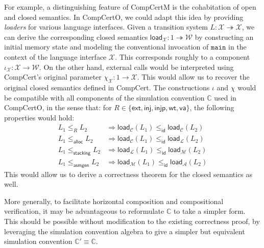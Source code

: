 \documentclass[11pt,oneside]{book}
\theoremstyle{definition}
\newcommand{\kw}[1]{\ensuremath{ \mathsf{#1} }}
\begin{document}
For example,
a distinguishing feature of CompCertM
is the cohabitation of open and closed semantics.
In CompCertO,
we could adapt this idea by providing
\emph{loaders} for various language interfaces.
Given a transition system $L : \mathcal{X} \twoheadrightarrow \mathcal{X}$,
we can derive the corresponding closed semantics
$\kw{load}_\mathcal{X} : 1 \twoheadrightarrow \mathcal{W}$
by constructing an initial memory state
and modeling the conventional invocation of $\texttt{main}$
in the context of the language interface $\mathcal{X}$.
This corresponds roughly to a component
$\iota_\mathcal{X} : \mathcal{X} \rightarrow \mathcal{W}$.
On the other hand,
external calls would be interpreted using
CompCert's original parameter
$\chi_\mathcal{X} : 1 \rightarrow \mathcal{X}$.
This would allow us to recover
the original closed semantics defined in CompCert.
The constructions $\iota$ and $\chi$ would be compatible
with all components of the simulation convention $\mathbb{C}$
used in CompCertO,
in the sense that:
for $R \in \{ \kw{ext}, \kw{inj}, \kw{injp}, \kw{wt}, \kw{va} \}$,
the following properties would hold:
\begin{align*}
  L_1 \le_R L_2 &\Rightarrow
    \kw{load}_\mathcal{C}(L_1) \le_\kw{id} \kw{load}_\mathcal{C}(L_2) \\
  L_1 \le_\kw{alloc} L_2 &\Rightarrow
    \kw{load}_\mathcal{C}(L_1) \le_\kw{id} \kw{load}_\mathcal{L}(L_2) \\
  L_1 \le_\kw{stacking} L_2 &\Rightarrow
    \kw{load}_\mathcal{L}(L_1) \le_\kw{id} \kw{load}_\mathcal{M}(L_2) \\
  L_1 \le_\kw{asmgen} L_2 &\Rightarrow
    \kw{load}_\mathcal{M}(L_1) \le_\kw{id} \kw{load}_\mathcal{A}(L_2)
\end{align*}
This would allow us to derive a correctness theorem
for the closed semantics as well.

More generally,
to facilitate horizontal composition
and compositional verification,
it may be advantageous to reformulate
$\mathbb{C}$
to take a simpler form.
This should be possible without
modification to the existing correctness proof,
by leveraging the simulation convention algebra
to give a simpler but equivalent
simulation convention $\mathbb{C}' \equiv \mathbb{C}$.
\end{document}

